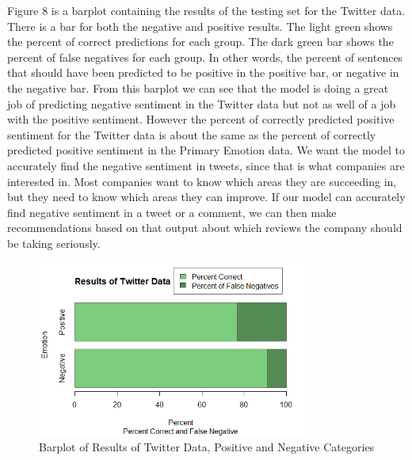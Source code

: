 \documentclass[titlepage,letterpaper]{article}
\begin{document}
Figure $8$ is a barplot containing the results of the testing set for the Twitter data. There is a bar for both the negative and positive results. The light green shows the percent of correct predictions for each group. The dark green bar shows the percent of false negatives for each group. In other words, the percent of sentences that should have been predicted to be positive in the positive bar, or negative in the negative bar. From this barplot we can see that the model is doing a great job of predicting negative sentiment in the Twitter data but not as well of a job with the positive sentiment. However the percent of correctly predicted positive sentiment for the Twitter data is about the same as the percent of correctly predicted positive sentiment in the Primary Emotion data. We want the model to accurately find the negative sentiment in tweets, since that is what companies are interested in. Most companies want to know which areas they are succeeding in, but they need to know which areas they can improve. If our model can accurately find negative sentiment in a tweet or a comment, we can then make recommendations based on that output about which reviews the company should be taking seriously. 

\begin{figure}[h!]
	\centering
	\includegraphics[width = 3.5in]{BarPlotTwitterResults.png}
	\caption{Barplot of Results of Twitter Data, Positive and Negative Categories}
\end{figure}
\end{document}
